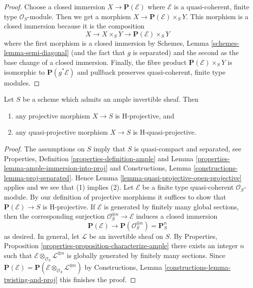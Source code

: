 \begin{proof}
Choose a closed immersion $X \to \mathbf{P}(\mathcal{E})$ where $\mathcal{E}$
is a quasi-coherent, finite type $\mathcal{O}_S$-module. Then
we get a morphism $X \to \mathbf{P}(\mathcal{E}) \times_S Y$.
This morphism is a closed immersion because it is the composition
$$
X \to X \times_S Y \to \mathbf{P}(\mathcal{E}) \times_S Y
$$
where the first morphism is a closed immersion by
Schemes, Lemma \ref{schemes-lemma-semi-diagonal}
(and the fact that $g$ is separated) and
the second as the base change of a closed immersion.
Finally, the fibre product $\mathbf{P}(\mathcal{E}) \times_S Y$
is isomorphic to $\mathbf{P}(g^*\mathcal{E})$ and pullback
preserves quasi-coherent, finite type modules.
\end{proof}

\begin{lemma}
\label{lemma-projective-over-quasi-projective-is-H-projective}
Let $S$ be a scheme which admits an ample invertible sheaf. Then
\begin{enumerate}
\item any projective morphism $X \to S$ is H-projective, and
\item any quasi-projective morphism $X \to S$ is H-quasi-projective.
\end{enumerate}
\end{lemma}

\begin{proof}
The assumptions on $S$ imply that $S$ is quasi-compact and separated, see
Properties, Definition \ref{properties-definition-ample} and
Lemma \ref{properties-lemma-ample-immersion-into-proj}
and Constructions, Lemma \ref{constructions-lemma-proj-separated}.
Hence Lemma \ref{lemma-quasi-projective-open-projective}
applies and we see that (1) implies (2).
Let $\mathcal{E}$ be a finite type quasi-coherent $\mathcal{O}_S$-module.
By our definition of projective morphisms it suffices to show that
$\mathbf{P}(\mathcal{E}) \to S$ is H-projective.
If $\mathcal{E}$ is generated by finitely many global sections,
then the corresponding surjection $\mathcal{O}_S^{\oplus n} \to \mathcal{E}$
induces a closed immersion
$$
\mathbf{P}(\mathcal{E}) \longrightarrow
\mathbf{P}(\mathcal{O}_S^{\oplus n}) = \mathbf{P}^n_S
$$
as desired. In general, let $\mathcal{L}$ be an invertible sheaf on $S$.
By Properties, Proposition \ref{properties-proposition-characterize-ample}
there exists an integer $n$ such that
$\mathcal{E} \otimes_{\mathcal{O}_S} \mathcal{L}^{\otimes n}$
is globally generated by finitely many sections. Since
$\mathbf{P}(\mathcal{E}) =
\mathbf{P}(\mathcal{E} \otimes_{\mathcal{O}_S} \mathcal{L}^{\otimes n})$ by
Constructions, Lemma \ref{constructions-lemma-twisting-and-proj}
this finishes the proof.
\end{proof}

